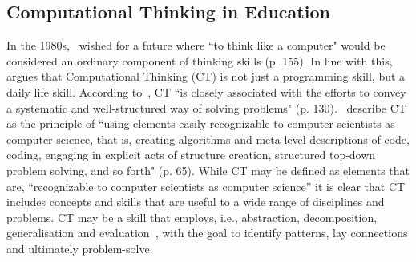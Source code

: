 \documentclass[manuscript,screen,review]{acmart}
\begin{document}
\subsection{Computational Thinking in Education}
In the 1980s,~\citet{papert1980mindstorms} wished for a future where ``to think like a computer" would be considered an ordinary component of thinking skills (p. 155). In line with this,~\citet{wing2006computationalthinking} argues that Computational Thinking (CT) is not just a programming skill, but a daily life skill. According to~\citet{otero2020computational}, CT ``is closely associated with the efforts to convey a systematic and well-structured way of solving problems" (p. 130).~\citet{tatar2017protoCT} describe CT as the principle of ``using elements easily recognizable to computer scientists as computer science, that is, creating algorithms and meta-level descriptions of code, coding, engaging in explicit acts of structure creation, structured top-down problem solving, and so forth" (p. 65). While CT may be defined as elements that are, ``recognizable to computer scientists as computer science'' it is clear that CT includes concepts and  skills that are useful to a wide range of disciplines and problems. CT may be a skill that employs, i.e., abstraction, decomposition, generalisation and evaluation~\cite{selby2013computational}, with the goal to identify patterns, lay connections and ultimately problem-solve. 



\end{document}
